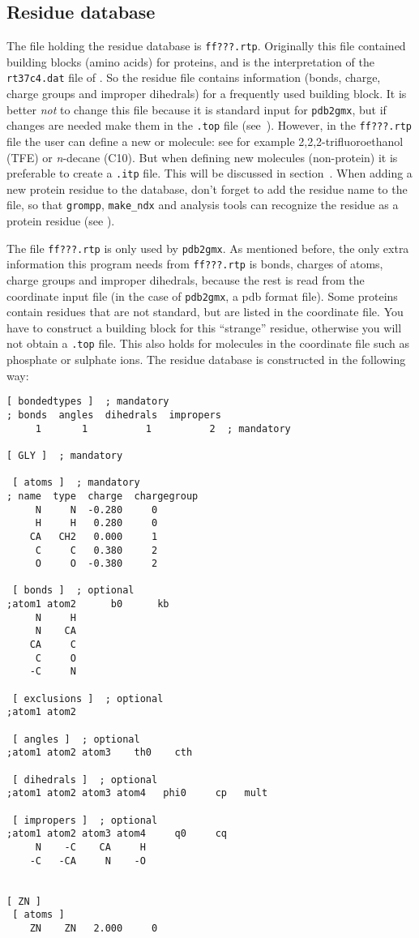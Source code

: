 \subsection{Residue database}
\label{subsec:rtp}
The file holding the residue database is {\tt ff???.rtp}. Originally
this file contained building blocks (amino acids) for proteins, and is
the {\gromacs} interpretation of the {\tt rt37c4.dat} file of {\gromos}. So
the residue file contains information (bonds, charge, charge groups
and improper dihedrals) for a frequently used building block. It is
better {\em not} to change this file because it is standard input for
{\tt pdb2gmx}, but if changes are needed make them in the
{\tt *.top} file (see~). 
However, in the {\tt ff???.rtp} file the user can define a new
 or molecule: see for example 2,2,2-trifluoroethanol
(TFE) or {\em n}-decane (C10). But when defining new molecules
(non-protein) it is preferable to create a {\tt *.itp}
file. This will be discussed in section~.
When adding a new protein residue to the database, don't forget to
add the residue name to the {\tt {}} file,
so that {\tt grompp}, {\tt make\_ndx} and analysis tools can recognize
the residue as a protein residue (see ).

The file {\tt ff???.rtp} is only used by {\tt pdb2gmx}.
As mentioned before, the only extra information this
program needs from {\tt ff???.rtp} is bonds, charges of atoms,
charge groups and improper dihedrals, because the rest is read from
the coordinate input file (in the case of {\tt pdb2gmx}, a pdb format
file). Some proteins contain residues that are not standard, but are
listed in the coordinate file. You have to construct a building block
for this ``strange'' residue, otherwise you will not obtain a
{\tt *.top} file. This also holds for molecules in the
coordinate file such as phosphate or sulphate ions.
The residue database is constructed in the following way:
{\small\begin{verbatim}
[ bondedtypes ]  ; mandatory
; bonds  angles  dihedrals  impropers
     1       1          1          2  ; mandatory

[ GLY ]  ; mandatory

 [ atoms ]  ; mandatory 
; name  type  charge  chargegroup 
     N     N  -0.280     0
     H     H   0.280     0
    CA   CH2   0.000     1
     C     C   0.380     2
     O     O  -0.380     2

 [ bonds ]  ; optional
;atom1 atom2      b0      kb
     N     H
     N    CA
    CA     C
     C     O
    -C     N

 [ exclusions ]  ; optional
;atom1 atom2

 [ angles ]  ; optional
;atom1 atom2 atom3    th0    cth

 [ dihedrals ]  ; optional
;atom1 atom2 atom3 atom4   phi0     cp   mult

 [ impropers ]  ; optional
;atom1 atom2 atom3 atom4     q0     cq
     N    -C    CA     H
    -C   -CA     N    -O


[ ZN ]
 [ atoms ]
    ZN    ZN   2.000     0
\end{verbatim}}

